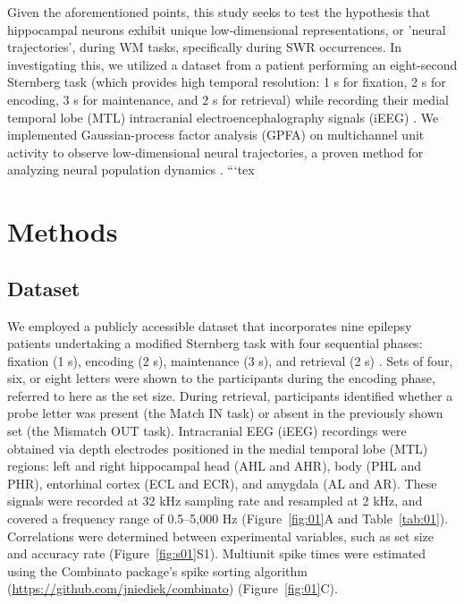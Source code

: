 \documentclass[final,3p,times,twocolumn]{elsarticle}
\begin{document}
\indent
Given the aforementioned points, this study seeks to test the hypothesis that hippocampal neurons exhibit unique low-dimensional representations, or 'neural trajectories', during WM tasks, specifically during SWR occurrences. In investigating this, we utilized a dataset from a patient performing an eight-second Sternberg task (which provides high temporal resolution: 1 s for fixation, 2 s for encoding, 3 s for maintenance, and 2 s for retrieval) while recording their medial temporal lobe (MTL) intracranial electroencephalography signals (iEEG) \cite{boran_dataset_2020}. We implemented Gaussian-process factor analysis (GPFA) on multichannel unit activity to observe low-dimensional neural trajectories, a proven method for analyzing neural population dynamics \cite{yu_gaussian-process_2009}.
\label{sec:introduction}```tex
\section{Methods}
\subsection{Dataset}
We employed a publicly accessible dataset \cite{boran_dataset_2020} that incorporates nine epilepsy patients undertaking a modified Sternberg task with four sequential phases: fixation (1 s), encoding (2 s), maintenance (3 s), and retrieval (2 s) \cite{boran_dataset_2020}. Sets of four, six, or eight letters were shown to the participants during the encoding phase, referred to here as the set size. During retrieval, participants identified whether a probe letter was present (the Match IN task) or absent in the previously shown set (the Mismatch OUT task). Intracranial EEG (iEEG) recordings were obtained via depth electrodes positioned in the medial temporal lobe (MTL) regions: left and right hippocampal head (AHL and AHR), body (PHL and PHR), entorhinal cortex (ECL and ECR), and amygdala (AL and AR). These signals were recorded at 32 kHz sampling rate and resampled at 2 kHz, and covered a frequency range of 0.5--5,000 Hz (Figure~\ref{fig:01}A and Table~\ref{tab:01}). Correlations were determined between experimental variables, such as set size and accuracy rate (Figure~\ref{fig:s01}S1). Multiunit spike times were estimated using the Combinato package's spike sorting algorithm \cite{niediek_reliable_2016} (\url{https://github.com/jniediek/combinato}) (Figure~\ref{fig:01}C).
\end{document}
